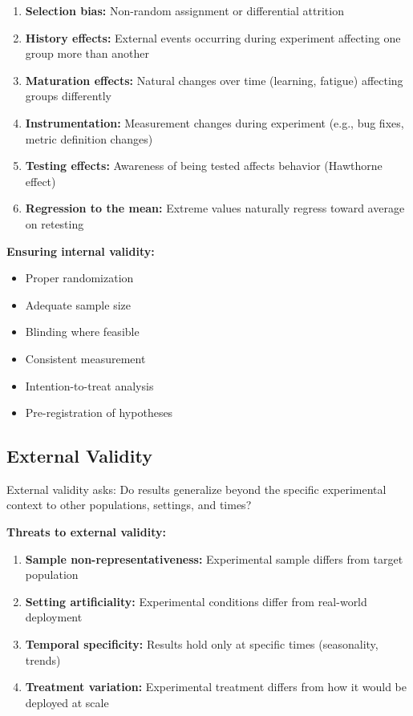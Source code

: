 \begin{enumerate}
    \item \textbf{Selection bias:} Non-random assignment or differential attrition

    \item \textbf{History effects:} External events occurring during experiment affecting one group more than another

    \item \textbf{Maturation effects:} Natural changes over time (learning, fatigue) affecting groups differently

    \item \textbf{Instrumentation:} Measurement changes during experiment (e.g., bug fixes, metric definition changes)

    \item \textbf{Testing effects:} Awareness of being tested affects behavior (Hawthorne effect)

    \item \textbf{Regression to the mean:} Extreme values naturally regress toward average on retesting
\end{enumerate}

\textbf{Ensuring internal validity:}

\begin{itemize}
    \item Proper randomization
    \item Adequate sample size
    \item Blinding where feasible
    \item Consistent measurement
    \item Intention-to-treat analysis
    \item Pre-registration of hypotheses
\end{itemize}

\subsection{External Validity}

External validity asks: Do results generalize beyond the specific experimental context to other populations, settings, and times?

\textbf{Threats to external validity:}

\begin{enumerate}
    \item \textbf{Sample non-representativeness:} Experimental sample differs from target population

    \item \textbf{Setting artificiality:} Experimental conditions differ from real-world deployment

    \item \textbf{Temporal specificity:} Results hold only at specific times (seasonality, trends)

    \item \textbf{Treatment variation:} Experimental treatment differs from how it would be deployed at scale
\end{enumerate}


